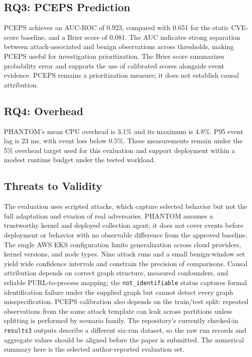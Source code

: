\documentclass[conference]{IEEEtran}
\begin{document}
\subsection{RQ3: PCEPS Prediction}
PCEPS achieves an AUC-ROC of 0.923, compared with 0.651 for the static CVE-score baseline, and a Brier score of 0.081. The AUC indicates strong separation between attack-associated and benign observations across thresholds, making PCEPS useful for investigation prioritization. The Brier score summarizes probability error and supports the use of calibrated scores alongside event evidence. PCEPS remains a prioritization measure; it does not establish causal attribution.

\subsection{RQ4: Overhead}
PHANTOM's mean CPU overhead is 3.1\% and its maximum is 4.8\%. P95 event lag is 23 ms, with event loss below 0.5\%. These measurements remain under the 5\% overhead target used for this evaluation and support deployment within a modest runtime budget under the tested workload.

\subsection{Threats to Validity}
The evaluation uses scripted attacks, which capture selected behavior but not the full adaptation and evasion of real adversaries. PHANTOM assumes a trustworthy kernel and deployed collection agent; it does not cover events before deployment or behavior with no observable difference from the approved baseline. The single AWS EKS configuration limits generalization across cloud providers, kernel versions, and node types. Nine attack runs and a small benign-window set yield wide confidence intervals and constrain the precision of comparisons. Causal attribution depends on correct graph structure, measured confounders, and reliable PURL-to-process mapping; the \texttt{not\_identifiable} status captures formal identification failure under the supplied graph but cannot detect every graph misspecification. PCEPS calibration also depends on the train/test split: repeated observations from the same attack template can leak across partitions unless splitting is performed by scenario family. The repository's currently checked-in \texttt{results3} outputs describe a different six-run dataset, so the raw run records and aggregate values should be aligned before the paper is submitted. The numerical summary here is the selected author-reported evaluation set.
\end{document}
